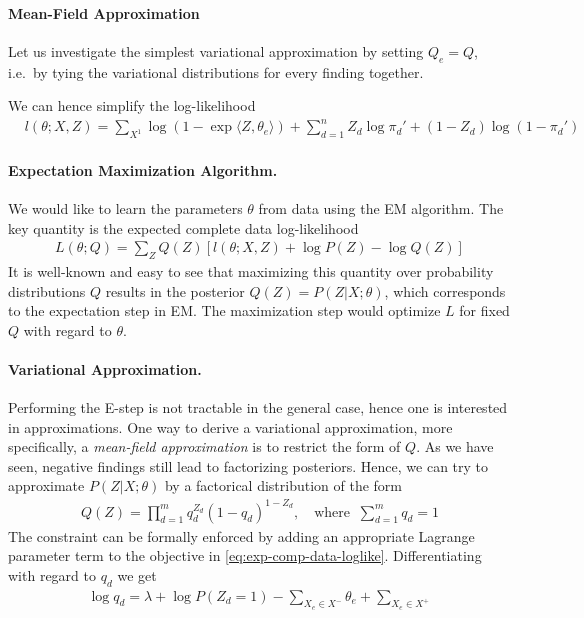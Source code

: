 \documentclass{article}
\begin{document}
\paragraph{Mean-Field Approximation}  Let us investigate the simplest variational approximation by setting $Q_e=Q$, i.e.~by tying the variational distributions for every finding together.    


\newpage

We can hence simplify the log-likelihood  
\begin{align}
\label{eq:cond-log-like-simplified}
& l(\theta; X, Z)  = 
\sum_{X^1} \log \left( 1-  \exp \langle Z, \theta_e \rangle \right) + \sum_{d=1}^n Z_d \log \pi_d' + (1-Z_d) \log (1 - \pi_d')
\end{align}

\newpage
\paragraph{Expectation Maximization Algorithm.}  We would like to learn the parameters $\theta$ from data using the EM algorithm. The key quantity is the expected complete data log-likelihood 
\begin{align}
\label{eq:exp-comp-data-loglike}
L(\theta; Q) = \sum_Z Q(Z) \left[ l(\theta; X, Z) + \log P(Z)  - \log Q(Z) \right] 
\end{align}
It is well-known and easy to see that maximizing this quantity over probability distributions $Q$ results in the posterior $Q(Z) = P(Z|X; \theta)$, which corresponds to the expectation step in EM. The maximization step would optimize $L$ for fixed  $Q$ with regard to $\theta$. 

\newpage



\paragraph{Variational Approximation.} Performing the E-step is not tractable in the general case, hence one is interested in approximations. One way to derive a variational approximation, more specifically, a \textit{mean-field approximation} is to restrict the form of $Q$. As we have seen, negative findings still lead to factorizing posteriors. Hence, we can try to approximate $P(Z|X; \theta)$ by a factorical distribution of the form 
\begin{align}
Q(Z) = \prod_{d=1}^m q_d^{Z_d} (1-q_d)^{1-Z_d}, \quad \text{where} \; \; \sum_{d=1}^m q_d =1
\end{align}
The constraint can be formally enforced by adding an appropriate Lagrange parameter term to the objective in \eqref{eq:exp-comp-data-loglike}. Differentiating with regard to $q_d$ we get 
\begin{align}
\log q_d = \lambda + \log P(Z_d=1) - \!\! \sum_{X_e \in X^-} \theta_e + \sum_{X_e \in X^+} 
\end{align}
\end{document}
